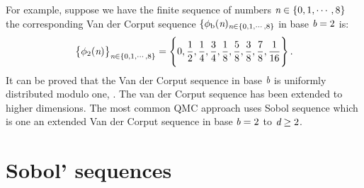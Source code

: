For example, suppose we have the finite sequence of numbers $\textit{n}\in \{0, 1,\cdots, 8\}$  the corresponding Van der Corput sequence 
$\{ \phi_{\textrm{b}}(\textit{n})_{\textit{n}\in \{0, 1,\cdots, 8\}}$ in base $\textit{b}=2$ is:
\begin{equation}
\big\{\phi_2(\textit{n})\big\}_{\textit{n}\in \{0, 1,\cdots, 8\}} = \Bigg\{0, \frac{1}{2}, \frac{1}{4}, \frac{3}{4}, \frac{1}{8},\frac{5}{8}, \frac{3}{8}, \frac{7}{8}, \frac{1}{16}\Bigg\} \,.
\end{equation}
It can be proved that the Van der Corput sequence in base $\textit{b}$ is uniformly distributed modulo one, \cite{leobacher2014introduction}. 
The van der Corput sequence has been extended to higher dimensions. 
The most common QMC approach uses Sobol sequence which is one an extended Van der Corput sequence in base $\textit{b}=2$ to $\textit{d}\geq2$. 
\section{Sobol' sequences}